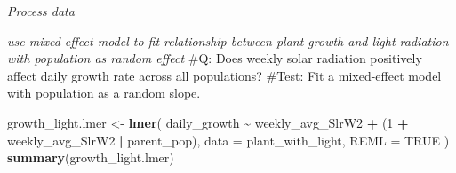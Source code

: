 \documentclass[
]{article}
\newenvironment{Shaded}{\begin{snugshade}}{\end{snugshade}}
\newcommand{\AttributeTok}[1]{\textcolor[rgb]{0.13,0.29,0.53}{#1}}
\newcommand{\CommentTok}[1]{\textcolor[rgb]{0.56,0.35,0.01}{\textit{#1}}}
\newcommand{\ConstantTok}[1]{\textcolor[rgb]{0.56,0.35,0.01}{#1}}
\newcommand{\DecValTok}[1]{\textcolor[rgb]{0.00,0.00,0.81}{#1}}
\newcommand{\FunctionTok}[1]{\textcolor[rgb]{0.13,0.29,0.53}{\textbf{#1}}}
\newcommand{\NormalTok}[1]{#1}
\newcommand{\OtherTok}[1]{\textcolor[rgb]{0.56,0.35,0.01}{#1}}
\newcommand{\SpecialCharTok}[1]{\textcolor[rgb]{0.81,0.36,0.00}{\textbf{#1}}}
\begin{document}
\emph{Process data}

\begin{Shaded}
\end{Shaded}

\emph{use mixed-effect model to fit relationship between plant growth
and light radiation with population as random effect} \#Q: Does weekly
solar radiation positively affect daily growth rate across all
populations? \#Test: Fit a mixed-effect model with population as a
random slope.

\begin{Shaded}
\begin{Highlighting}[]
\NormalTok{growth\_light.lmer }\OtherTok{\textless{}{-}} \FunctionTok{lmer}\NormalTok{(}
\NormalTok{  daily\_growth }\SpecialCharTok{\textasciitilde{}}\NormalTok{ weekly\_avg\_SlrW2 }\SpecialCharTok{+}                     
\NormalTok{    (}\DecValTok{1} \SpecialCharTok{+}\NormalTok{ weekly\_avg\_SlrW2 }\SpecialCharTok{|}\NormalTok{ parent\_pop),                                    }
  \AttributeTok{data =}\NormalTok{ plant\_with\_light, }\AttributeTok{REML =} \ConstantTok{TRUE}
\NormalTok{)}
\FunctionTok{summary}\NormalTok{(growth\_light.lmer)}
\end{Highlighting}
\end{Shaded}
\end{document}
